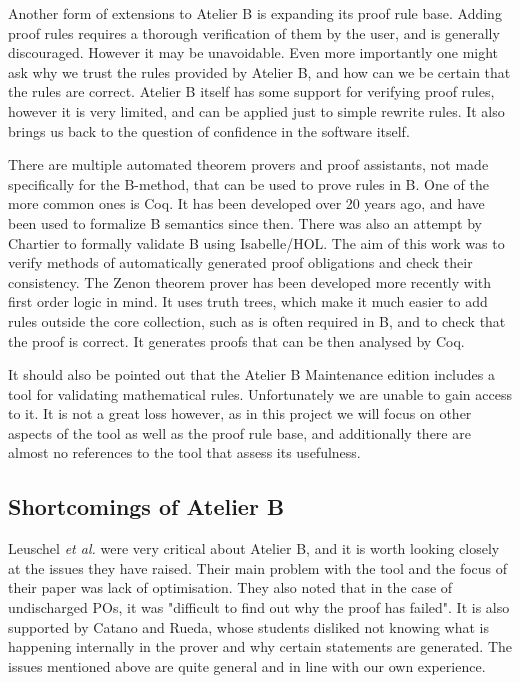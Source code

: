 \documentclass[12pt,journal,duplex]{IEEEtran}
\begin{document}
	Another form of extensions to Atelier B is expanding its proof rule base. Adding proof rules requires a thorough verification of them by the user, and is generally discouraged. However it may be unavoidable. Even more importantly one might ask why we trust the rules provided by Atelier B, and how can we be certain that the rules are correct. Atelier B itself has some support for verifying proof rules, however it is very limited, and can be applied just to simple rewrite rules. It also brings us back to the question of confidence in the software itself.
	
	There are multiple automated theorem provers and proof assistants, not made specifically for the B-method, that can be used to prove rules in B. One of the more common ones is Coq. It has been developed over 20 years ago, and have been used to formalize B semantics since then\cite{Coq and PVS}. There was also an attempt by Chartier to formally validate B using Isabelle/HOL\cite{Isabelle}. The aim of this work was to verify methods of automatically generated proof obligations and check their consistency. The Zenon theorem prover has been developed more recently with first order logic in mind\cite{Zenon}. It uses truth trees, which make it much easier to add rules outside the core collection, such as is often required in B, and to check that the proof is correct. It generates proofs that can be then analysed by Coq.
	
	It should also be pointed out that the Atelier B Maintenance edition includes a tool for validating mathematical rules. Unfortunately we are unable to gain access to it. It is not a great loss however, as in this project we will focus on other aspects of the tool as well as the proof rule base, and additionally there are almost no references to the tool that assess its usefulness.
	

	\subsection{Shortcomings of Atelier B}

	Leuschel \emph{et al.} were very critical about Atelier B, and it is worth looking closely at the issues they have raised. Their main problem with the tool and the focus of their paper was lack of optimisation. They also noted that in the case of undischarged POs, it was "difficult to find out why the proof has failed". It is also supported by Catano and Rueda, whose students disliked not knowing what is happening internally in the prover and why certain statements are generated. The issues mentioned above are quite general and in line with our own experience.
\end{document}
